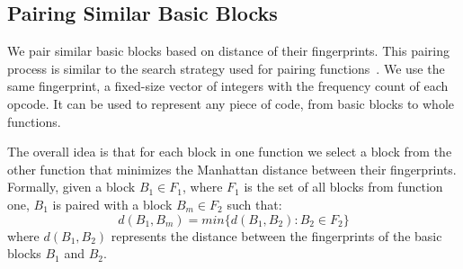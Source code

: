 

\subsection{Pairing Similar Basic Blocks}
\label{sec:bb-rank}

We pair similar basic blocks based on distance of their fingerprints.
This pairing process is similar to the search strategy used for pairing functions~\cite{rocha19}.
We use the same fingerprint, a fixed-size vector of integers with the frequency count of each opcode.
It can be used to represent any piece of code, from basic blocks to whole functions.

The overall idea is that for each block in one function we select a block from the other function that minimizes the Manhattan distance between their fingerprints.
Formally, given a block $B_1 \in F_1$, where $F_1$ is the set of all blocks from function one, $B_1$ is paired with a block $B_m \in F_2$ such that:
\[  d(B_1,B_m) = min\{d(B_1,B_2) : B_2 \in F_2\} \]
where $d(B_1,B_2)$ represents the distance between the fingerprints of the basic blocks $B_1$ and $B_2$.



